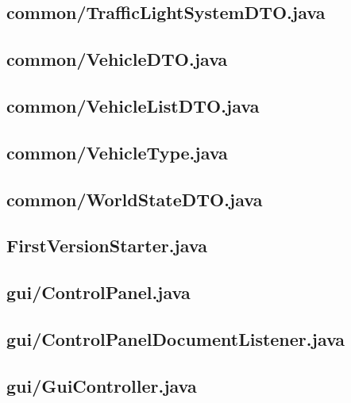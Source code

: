\subsection{common/TrafficLightSystemDTO.java}

\newpage
\subsection{common/VehicleDTO.java}

\newpage
\subsection{common/VehicleListDTO.java}

\newpage
\subsection{common/VehicleType.java}

\newpage
\subsection{common/WorldStateDTO.java}

\newpage
\subsection{FirstVersionStarter.java}

\newpage
\subsection{gui/ControlPanel.java}

\newpage
\subsection{gui/ControlPanelDocumentListener.java}

\newpage
\subsection{gui/GuiController.java}

\newpage
